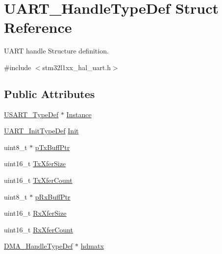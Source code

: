 \hypertarget{struct_u_a_r_t___handle_type_def}{\section{U\-A\-R\-T\-\_\-\-Handle\-Type\-Def Struct Reference}
\label{struct_u_a_r_t___handle_type_def}
}


U\-A\-R\-T handle Structure definition.  




{\ttfamily \#include $<$stm32l1xx\-\_\-hal\-\_\-uart.\-h$>$}

\subsection*{Public Attributes}
\begin{DoxyCompactItemize}
\item 
\hyperlink{struct_u_s_a_r_t___type_def}{U\-S\-A\-R\-T\-\_\-\-Type\-Def} $\ast$ \hyperlink{struct_u_a_r_t___handle_type_def_a02df2e8e2b4d929d5e1b5b96566a9fb6}{Instance}
\item 
\hyperlink{struct_u_a_r_t___init_type_def}{U\-A\-R\-T\-\_\-\-Init\-Type\-Def} \hyperlink{struct_u_a_r_t___handle_type_def_a98a8e13e0b5a227d31ab0a4b346cf4df}{Init}
\item 
uint8\-\_\-t $\ast$ \hyperlink{struct_u_a_r_t___handle_type_def_a79dd401b02d57f1b2d4618744402850c}{p\-Tx\-Buff\-Ptr}
\item 
uint16\-\_\-t \hyperlink{struct_u_a_r_t___handle_type_def_a98e2ea90caba72ac0cd5b1815a5ccb81}{Tx\-Xfer\-Size}
\item 
uint16\-\_\-t \hyperlink{struct_u_a_r_t___handle_type_def_a874ef209c0571231b2e4b951007eefac}{Tx\-Xfer\-Count}
\item 
uint8\-\_\-t $\ast$ \hyperlink{struct_u_a_r_t___handle_type_def_a9541d846ad12e9376ddd0062efe3196c}{p\-Rx\-Buff\-Ptr}
\item 
uint16\-\_\-t \hyperlink{struct_u_a_r_t___handle_type_def_a22782fdbe156661bc9710efd02228746}{Rx\-Xfer\-Size}
\item 
uint16\-\_\-t \hyperlink{struct_u_a_r_t___handle_type_def_ade988f08540556bd89766e4cc2bb4dec}{Rx\-Xfer\-Count}
\item 
\hyperlink{group___d_m_a___exported___types_ga92b907d56a9c29b93d46782a7a04f91e}{D\-M\-A\-\_\-\-Handle\-Type\-Def} $\ast$ \hyperlink{struct_u_a_r_t___handle_type_def_a995e0ff8dd7c987cae31b3e153166acb}{hdmatx}
\item 

\end{DoxyCompactItemize}
